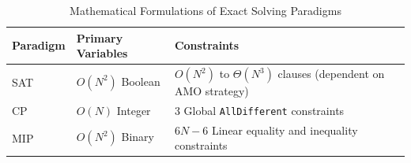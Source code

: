 \begin{table}[h]
\centering
\caption{Mathematical Formulations of Exact Solving Paradigms}
\begin{tabular}{@{}llp{8cm}@{}}
\toprule
Paradigm & Primary Variables & Constraints \\
\midrule
SAT & $O(N^2)$ Boolean & $O(N^2)$ to $\Theta(N^3)$ clauses (dependent on AMO strategy) \\
CP & $O(N)$ Integer & 3 Global \texttt{AllDifferent} constraints \\
MIP & $O(N^2)$ Binary & $6N-6$ Linear equality and inequality constraints \\
\bottomrule
\end{tabular}
\label{tab:formulations}
\end{table}
